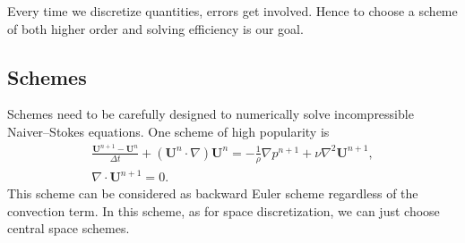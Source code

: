 \documentclass[english, nochinese]{pkupaper}
\begin{document}
Every time we discretize quantities, errors get involved. Hence to choose a scheme of both higher order and solving efficiency is our goal.

\subsection{Schemes}\label{SSec:Schemes}



Schemes need to be carefully designed to numerically solve incompressible Naiver--Stokes equations. One scheme of high popularity is
\begin{equation}
\begin{gathered}
\frac{\mathbf{U}^{n+1} - \mathbf{U}^n}{\Delta t} + (\mathbf{U}^n\cdot\nabla)\mathbf{U}^n = - \frac{1}{\rho} \nabla p^{n+1} + \nu \nabla^2 \mathbf{U}^{n+1}, \\
\nabla\cdot \mathbf{U}^{n+1} = 0.
\end{gathered}
\end{equation}
This scheme can be considered as backward Euler scheme regardless of the convection term. In this scheme, as for space discretization, we can just choose central space schemes.


\end{document}
